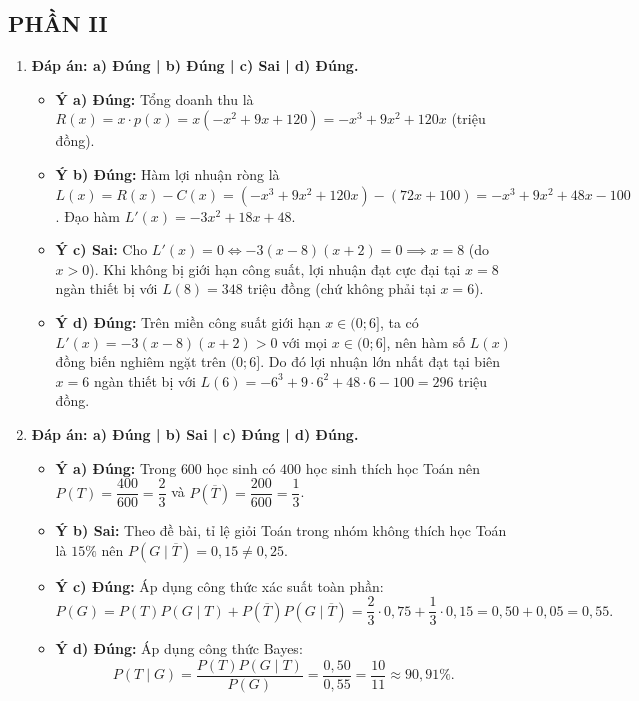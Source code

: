 \documentclass[12pt,a4paper]{article}
\begin{document}
\subsection*{PHẦN II}
\begin{enumerate}[label=\textbf{Câu \arabic*:}, leftmargin=*]

\item \textbf{Đáp án: a) Đúng | b) Đúng | c) Sai | d) Đúng.}
\begin{itemize}[leftmargin=*]
    \item \textbf{Ý a) Đúng:} Tổng doanh thu là $R(x) = x \cdot p(x) = x(-x^2 + 9x + 120) = -x^3 + 9x^2 + 120x$ (triệu đồng).
    \item \textbf{Ý b) Đúng:} Hàm lợi nhuận ròng là $L(x) = R(x) - C(x) = (-x^3 + 9x^2 + 120x) - (72x + 100) = -x^3 + 9x^2 + 48x - 100$. Đạo hàm $L'(x) = -3x^2 + 18x + 48$.
    \item \textbf{Ý c) Sai:} Cho $L'(x) = 0 \iff -3(x - 8)(x + 2) = 0 \implies x = 8$ (do $x > 0$). Khi không bị giới hạn công suất, lợi nhuận đạt cực đại tại $x = 8$ ngàn thiết bị với $L(8) = 348$ triệu đồng (chứ không phải tại $x = 6$).
    \item \textbf{Ý d) Đúng:} Trên miền công suất giới hạn $x \in (0; 6]$, ta có $L'(x) = -3(x - 8)(x + 2) > 0$ với mọi $x \in (0; 6]$, nên hàm số $L(x)$ đồng biến nghiêm ngặt trên $(0; 6]$. Do đó lợi nhuận lớn nhất đạt tại biên $x = 6$ ngàn thiết bị với $L(6) = -6^3 + 9\cdot 6^2 + 48\cdot 6 - 100 = 296$ triệu đồng.
\end{itemize}

\item \textbf{Đáp án: a) Đúng | b) Sai | c) Đúng | d) Đúng.}
\begin{itemize}[leftmargin=*]
    \item \textbf{Ý a) Đúng:} Trong $600$ học sinh có $400$ học sinh thích học Toán nên $P(T) = \dfrac{400}{600} = \dfrac{2}{3}$ và $P(\overline{T}) = \dfrac{200}{600} = \dfrac{1}{3}$.
    \item \textbf{Ý b) Sai:} Theo đề bài, tỉ lệ giỏi Toán trong nhóm không thích học Toán là $15\%$ nên $P(G \mid \overline{T}) = 0{,}15 \ne 0{,}25$.
    \item \textbf{Ý c) Đúng:} Áp dụng công thức xác suất toàn phần:
    $$P(G) = P(T)P(G \mid T) + P(\overline{T})P(G \mid \overline{T}) = \dfrac{2}{3} \cdot 0{,}75 + \dfrac{1}{3} \cdot 0{,}15 = 0{,}50 + 0{,}05 = 0{,}55.$$
    \item \textbf{Ý d) Đúng:} Áp dụng công thức Bayes:
    $$P(T \mid G) = \dfrac{P(T)P(G \mid T)}{P(G)} = \dfrac{0{,}50}{0{,}55} = \dfrac{10}{11} \approx 90{,}91\%.$$
\end{itemize}


\end{enumerate}
\end{document}
